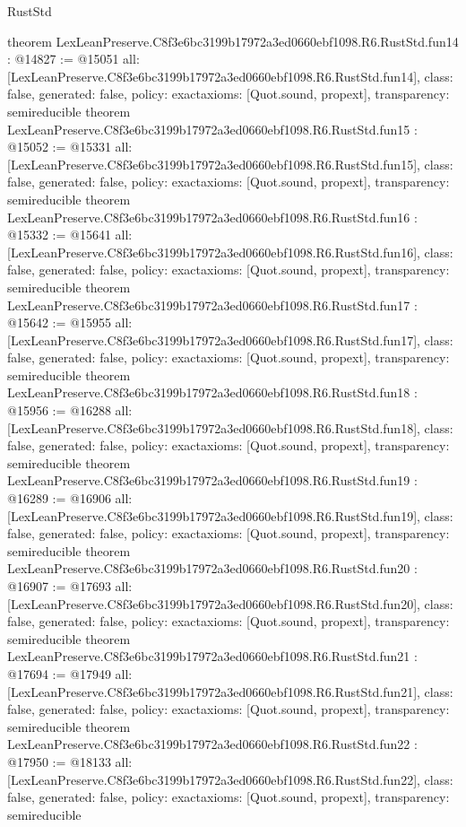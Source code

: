 \begin{lexlean}{RustStd}
\begin{coremodule}
{}
theorem LexLeanPreserve.C8f3e6bc3199b17972a3ed0660ebf1098.R6.RustStd.fun14 : @14827 := @15051 {
  all: [LexLeanPreserve.C8f3e6bc3199b17972a3ed0660ebf1098.R6.RustStd.fun14],
  class: false,
  generated: false,
  policy: exact{axioms: [Quot.sound, propext]},
  transparency: semireducible
}
theorem LexLeanPreserve.C8f3e6bc3199b17972a3ed0660ebf1098.R6.RustStd.fun15 : @15052 := @15331 {
  all: [LexLeanPreserve.C8f3e6bc3199b17972a3ed0660ebf1098.R6.RustStd.fun15],
  class: false,
  generated: false,
  policy: exact{axioms: [Quot.sound, propext]},
  transparency: semireducible
}
theorem LexLeanPreserve.C8f3e6bc3199b17972a3ed0660ebf1098.R6.RustStd.fun16 : @15332 := @15641 {
  all: [LexLeanPreserve.C8f3e6bc3199b17972a3ed0660ebf1098.R6.RustStd.fun16],
  class: false,
  generated: false,
  policy: exact{axioms: [Quot.sound, propext]},
  transparency: semireducible
}
theorem LexLeanPreserve.C8f3e6bc3199b17972a3ed0660ebf1098.R6.RustStd.fun17 : @15642 := @15955 {
  all: [LexLeanPreserve.C8f3e6bc3199b17972a3ed0660ebf1098.R6.RustStd.fun17],
  class: false,
  generated: false,
  policy: exact{axioms: [Quot.sound, propext]},
  transparency: semireducible
}
theorem LexLeanPreserve.C8f3e6bc3199b17972a3ed0660ebf1098.R6.RustStd.fun18 : @15956 := @16288 {
  all: [LexLeanPreserve.C8f3e6bc3199b17972a3ed0660ebf1098.R6.RustStd.fun18],
  class: false,
  generated: false,
  policy: exact{axioms: [Quot.sound, propext]},
  transparency: semireducible
}
theorem LexLeanPreserve.C8f3e6bc3199b17972a3ed0660ebf1098.R6.RustStd.fun19 : @16289 := @16906 {
  all: [LexLeanPreserve.C8f3e6bc3199b17972a3ed0660ebf1098.R6.RustStd.fun19],
  class: false,
  generated: false,
  policy: exact{axioms: [Quot.sound, propext]},
  transparency: semireducible
}
theorem LexLeanPreserve.C8f3e6bc3199b17972a3ed0660ebf1098.R6.RustStd.fun20 : @16907 := @17693 {
  all: [LexLeanPreserve.C8f3e6bc3199b17972a3ed0660ebf1098.R6.RustStd.fun20],
  class: false,
  generated: false,
  policy: exact{axioms: [Quot.sound, propext]},
  transparency: semireducible
}
theorem LexLeanPreserve.C8f3e6bc3199b17972a3ed0660ebf1098.R6.RustStd.fun21 : @17694 := @17949 {
  all: [LexLeanPreserve.C8f3e6bc3199b17972a3ed0660ebf1098.R6.RustStd.fun21],
  class: false,
  generated: false,
  policy: exact{axioms: [Quot.sound, propext]},
  transparency: semireducible
}
theorem LexLeanPreserve.C8f3e6bc3199b17972a3ed0660ebf1098.R6.RustStd.fun22 : @17950 := @18133 {
  all: [LexLeanPreserve.C8f3e6bc3199b17972a3ed0660ebf1098.R6.RustStd.fun22],
  class: false,
  generated: false,
  policy: exact{axioms: [Quot.sound, propext]},
  transparency: semireducible
}
\end{coremodule}
\end{lexlean}
